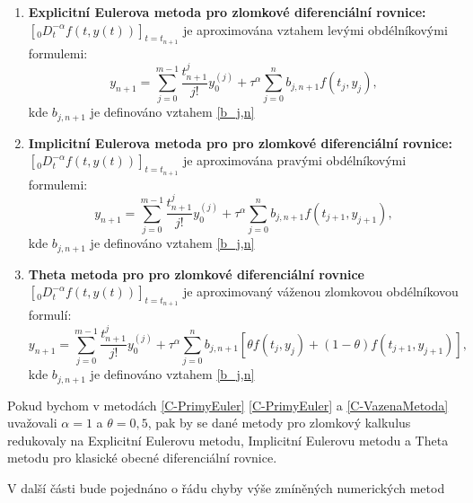 \documentclass[a4paper,12pt,twoside]{article}
\theoremstyle{definition}
\theoremstyle{remark}
\numberwithin{equation}{section}
\numberwithin{table}{section}
\numberwithin{figure}{section}
\begin{document}
\begin{enumerate}[label=(\textbf{\arabic*})]
	\item \textbf{Explicitní Eulerova metoda pro zlomkové diferenciální rovnice:}
	$\left[_{0}D_{t}^{-\alpha} f\left(t,y\left(t\right)\right)\right]_{t=t_{n+1}}$ je aproximována vztahem levými obdélníkovými formulemi:
		\begin{equation} \label{C-PrimyEuler}
			y_{n+1} = \sum_{j=0}^{m-1} \frac{t_{n+1}^{j}}{j!} y_{0}^{(j)} + \tau^{\alpha} \sum_{j = 0}^{n} b_{j,n+1} f\left(t_{j}, y_{j}\right),
		\end{equation}
	kde $b_{j, n+1}$ je definováno vztahem \eqref{b_j,n} \cite{Cangpin}
	
	\item \textbf{Implicitní Eulerova metoda pro pro zlomkové diferenciální rovnice:}
		$\left[_{0}D_{t}^{-\alpha} f\left(t,y\left(t\right)\right)\right]_{t=t_{n+1}}$ je aproximována pravými obdélníkovými formulemi:
		\begin{equation} \label{C-NeprimyEuler}
			y_{n+1} = \sum_{j=0}^{m-1} \frac{t_{n+1}^{j}}{j!} y_{0}^{(j)} + \tau^{\alpha} \sum_{j = 0}^{n} 	b_{j,n+1} f\left(t_{j+1}, y_{j+1}\right),
		\end{equation}
	kde $b_{j, n+1}$ je definováno vztahem \eqref{b_j,n} \cite{Cangpin}
	
	\item \textbf{Theta metoda pro pro zlomkové diferenciální rovnice} %
			$\left[_{0}D_{t}^{-\alpha} f\left(t,y\left(t\right)\right)\right]_{t=t_{n+1}}$ je aproximovaný váženou zlomkovou obdélníkovou formulí:
		\begin{equation} \label{C-VazenaMetoda}
			y_{n+1} = \sum_{j=0}^{m-1} \frac{t_{n+1}^{j}}{j!} y_{0}^{(j)} + \tau^{\alpha} \sum_{j = 0}^{n} 	b_{j,n+1} \left[\theta f\left(t_{j}, y_{j}\right) + \left(1-\theta \right)f \left(t_{j+1}, y_{j+1}\right)\right],
		\end{equation}
		kde $b_{j, n+1}$ je definováno vztahem \eqref{b_j,n}		\cite{Cangpin}
\end{enumerate}

Pokud bychom v metodách \eqref{C-PrimyEuler} \eqref{C-PrimyEuler} a \eqref{C-VazenaMetoda} uvažovali $\alpha = 1$ a $\theta = 0,5$, pak by se dané metody pro zlomkový kalkulus redukovaly na Explicitní Eulerovu metodu, Implicitní Eulerovu metodu a Theta metodu pro klasické obecné diferenciální rovnice.

V další části bude pojednáno o řádu chyby výše zmíněných numerických metod
\end{document}

